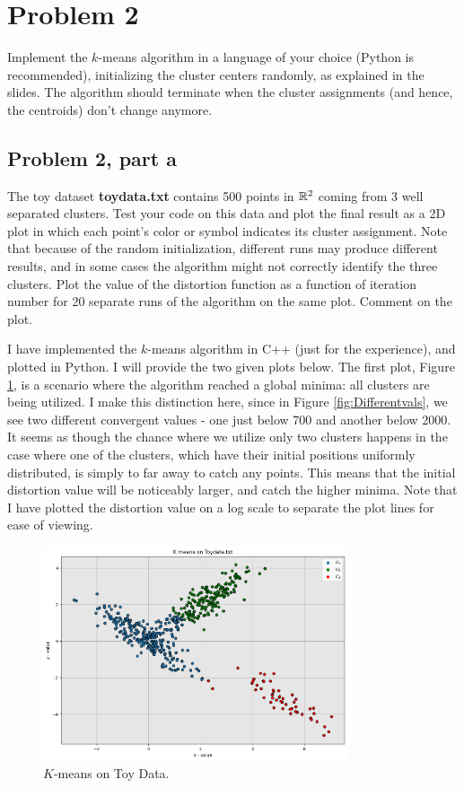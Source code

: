 \section{Problem 2}
Implement the $k$-means algorithm in a language of your choice (Python is recommended), initializing the cluster centers randomly, as explained in the slides. The algorithm should terminate when the cluster assignments (and hence, the centroids) don’t change anymore.

\subsection{Problem 2, part a}
The toy dataset \textbf{toydata.txt} contains 500 points in $\mathbb{R}^2$ coming from 3 well separated clusters. Test your code on this data and plot the final result as a 2D plot in which each point’s color or symbol indicates its cluster assignment. Note that because of the random initialization, different runs may produce different results, and in some cases the algorithm might not correctly identify the three clusters. Plot the value of the distortion function as a function of iteration number for 20 separate runs of the algorithm on the same plot. Comment on the plot.
\partbreak
\begin{solution}

    I have implemented the $k$-means algorithm in C++ (just for the experience), and plotted in Python. I will provide the two given plots below. The first plot, Figure \ref{fig:kmeans}, is a scenario where the algorithm reached a global minima: all clusters are being utilized. I make this distinction here, since in Figure \ref{fig:Differentvals}, we see two different convergent values - one just below 700 and another below 2000. It seems as though the chance where we utilize only two clusters happens in the case where one of the clusters, which have their initial positions uniformly distributed, is simply to far away to catch any points. This means that the initial distortion value will be noticeably larger, and catch the higher minima. Note that I have plotted the distortion value on a log scale to separate the plot lines for ease of viewing.   

    
\end{solution}

\begin{figure}
    \centering
    \includegraphics[width = 0.8\textwidth]{Figure/kmeans.png}
    \caption{$K$-means on Toy Data.}
    \label{fig:kmeans}
\end{figure}

